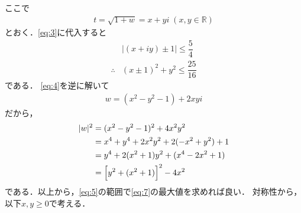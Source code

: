 \documentclass[../../main.tex]{subfiles}
\begin{document}
ここで
\begin{align}
  t = \sqrt{1+w} = x + yi \; (x,y \in \mathbb{R}) \label{eq:4}
\end{align}
とおく．\cref{eq:3}に代入すると
\begin{align}
  & |(x+iy)\pm 1 | \le \dfrac{5}{4} \\
  \therefore
  & \left(x\pm 1\right)^2 + y^2 \le \dfrac{25}{16} \label{eq:5}
\end{align}
である．
\cref{eq:4}を逆に解いて
\begin{align}
  w = (x^2 - y^2 - 1) + 2xy i \label{eq:6}
\end{align}
だから，
\begin{align}
  |w|^2
  & = (x^2 - y^2 - 1)^2 + 4x^2 y^2 \\
  & = x^4 + y^4 + 2x^2y^2 + 2(-x^2+y^2) + 1 \\
  & = y^4 + 2(x^2+1)y^2 + (x^4 - 2x^2 + 1) \\
  & = \Bigl[ y^2 + (x^2+1) \Bigr]^2 - 4x^2 \label{eq:7}
\end{align}
である．以上から，\cref{eq:5}の範囲で\cref{eq:7}の最大値を求めれば良い．
対称性から，以下$x, y \ge 0$で考える．
\end{document}
